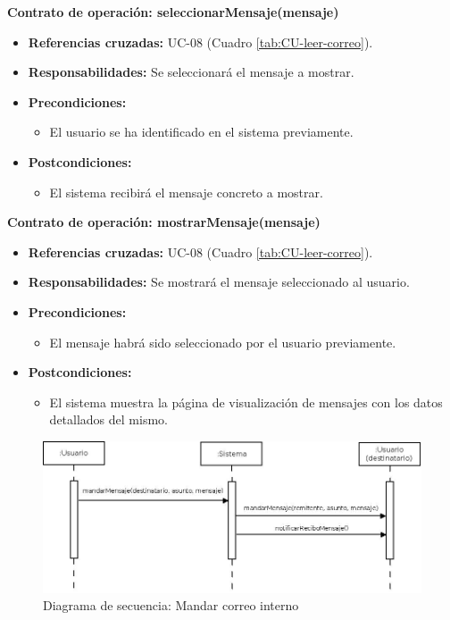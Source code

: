 \textbf{Contrato de operación: seleccionarMensaje(mensaje)}
\begin{itemize}
\item \textbf{Referencias cruzadas:} UC-08 (Cuadro \ref{tab:CU-leer-correo}).
\item \textbf{Responsabilidades:} Se seleccionará el mensaje a mostrar.
\item \textbf{Precondiciones:} 
 \begin{itemize}
\item El usuario se ha identificado en el sistema previamente.
\end {itemize}
\item \textbf{Postcondiciones:} 
 \begin{itemize}
\item El sistema recibirá el mensaje concreto a mostrar.
\end {itemize}
\end {itemize}

\textbf{Contrato de operación: mostrarMensaje(mensaje)}
\begin{itemize}
\item \textbf{Referencias cruzadas:} UC-08 (Cuadro \ref{tab:CU-leer-correo}).
\item \textbf{Responsabilidades:} Se mostrará el mensaje seleccionado al usuario.
\item \textbf{Precondiciones:} 
 \begin{itemize}
\item El mensaje habrá sido seleccionado por el usuario previamente.
\end {itemize}
\item \textbf{Postcondiciones:} 
 \begin{itemize}
\item El sistema muestra la página de visualización de mensajes con los datos detallados del mismo.
\end {itemize}
\end {itemize}


\vspace{10mm}

\begin{figure}[H]
\centering
  \includegraphics[scale=.45]{img/secuencias/gestion-servicios-mandar-correo.jpeg}
  \caption{Diagrama de secuencia: Mandar correo interno}
  \label{fig:secuencia-gestion-servicios-mandar-correo}
\end{figure}

